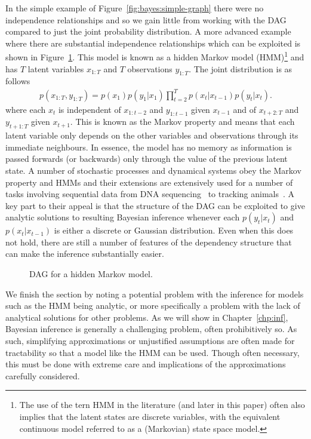 In the simple example of Figure~\ref{fig:bayes:simple-graph} there were no independence relationships and so
we gain little from working with the DAG compared to just the joint probability distribution.
A more advanced example where there are substantial independence relationships which can
be exploited is shown in Figure~\ref{fig:bayes:hmm}.
  This model is known as a hidden Markov model 
(HMM)\footnote{The use of the tern HMM in the literature (and later in this paper) often also implies that
	the latent states are discrete variables, with the equivalent continuous model referred to as a
	(Markovian) state space model.}
and has $T$ latent variables $x_{1:T}$ and $T$ observations $y_{1:T}$.  The joint distribution is as follows
\begin{align}
\label{eq:bayes:hmm}
p(x_{1:T},y_{1:T}) = p(x_1) p(y_1|x_1)\prod_{t=2}^{T} p(x_t|x_{t-1})p(y_t|x_t).
\end{align}
where each $x_t$ is
independent of $x_{1:{t-2}}$ and $y_{1:t-1}$ given $x_{t-1}$ and of $x_{t+2:T}$ and $y_{{t+1}:T}$ given $x_{t+1}$.
This is known as the Markov property and means that each latent variable only depends on the other
variables and observations through its immediate neighbours.  In essence, the model has no memory as information
is passed forwards (or backwards) only through the value of the previous latent state.  A number of stochastic
processes and dynamical systems obey the Markov property and HMMs and their extensions are extensively used for
a number of tasks involving sequential data from DNA sequencing~\citep{durbin1998biological} to tracking
animals~\citep{dhir2016tracking,dhir2017interpreting}.  A key part to their appeal is that the structure of the
DAG can be exploited to give analytic solutions to resulting Bayesian inference whenever each $p(y_t | x_t)$ 
and $p(x_t | x_{t-1})$ is either a discrete or Gaussian distribution. Even when this does not hold, there 
are still a number of features of the dependency structure that can make the inference substantially easier.

\begin{figure}[t]
	\centering 
	
	\caption{DAG for a hidden Markov model.
		\label{fig:bayes:hmm}}
\end{figure}

We finish the section by noting a potential problem with the inference for models such as the HMM being analytic,
or more specifically a problem with the lack of analytical solutions for other problems.  As we will show
in Chapter~\ref{chp:inf}, Bayesian inference is generally a challenging problem, often prohibitively so.  As
such, simplifying approximations or unjustified assumptions are often made for tractability so that a model 
like the HMM can be used. Though often necessary, this must be done with extreme care and implications of 
the approximations carefully considered.